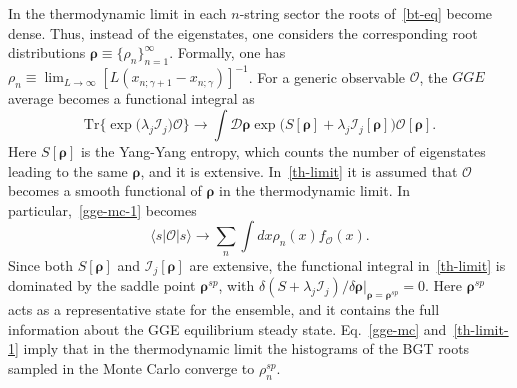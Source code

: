 \documentclass[twocolumn,superscriptaddress,prb,10pt]{revtex4-1}
\begin{document}
In the thermodynamic limit in each $n$-string sector the roots of~\eqref{bt-eq} become 
dense. Thus, instead of the eigenstates, one considers the corresponding root 
distributions $\pmb{\rho}\equiv\{\rho_n\}_{n=1}^\infty$. Formally, one has $\rho_n
\equiv\lim_{L\to\infty}[L(x_{n;\gamma+1}-x_{n;\gamma})]^{-1}$. For a generic observable 
${\mathcal O}$, the $GGE$ average becomes a functional integral as 
%
\begin{equation}
\label{th-limit}
\textrm{Tr}\big\{\exp\big({\lambda_j{\mathcal I}_j}\big){\mathcal O}\big\}
\rightarrow\int{\mathcal D}\pmb{\rho}\exp\big(S[\pmb{\rho}]+
\lambda_j{\mathcal I}_j[\pmb{\rho}]\big){\mathcal O}[\pmb{\rho}].
\end{equation}
%
Here $S[\pmb{\rho}]$ is the Yang-Yang entropy, which counts the number of eigenstates 
leading to the same $\pmb{\rho}$, and it is extensive. In~\eqref{th-limit} 
it is assumed that ${\mathcal O}$ becomes a smooth functional of $\pmb{\rho}$ 
in the thermodynamic limit. In particular,~\eqref{gge-mc-1} becomes 
%
\begin{equation}
\label{th-limit-1}
\langle s|{\mathcal O}|s\rangle\to\sum\limits_{n}\int dx\rho_n(x)f_{{\mathcal O}}(x).
\end{equation}
%
Since both $S[\pmb{\rho}]$ and ${\mathcal I}_j[\pmb{\rho}]$ are extensive, the functional 
integral in~\eqref{th-limit} is dominated by the saddle point $\pmb{\rho}^{sp}$, with $\delta(S+\lambda_j{\mathcal I}_j)/
\delta\pmb{\rho}|_{\pmb{\rho}=\pmb{\rho}^{sp}}=0$. Here $\pmb{\rho}^{sp}$ acts as a representative 
state for the ensemble, and it contains the full information about the GGE equilibrium steady 
state. Eq.~\eqref{gge-mc} and~\eqref{th-limit-1} imply that in the thermodynamic limit 
the histograms of the BGT roots sampled in the Monte Carlo converge to $\rho_{n}^{sp}$.  
\end{document}
